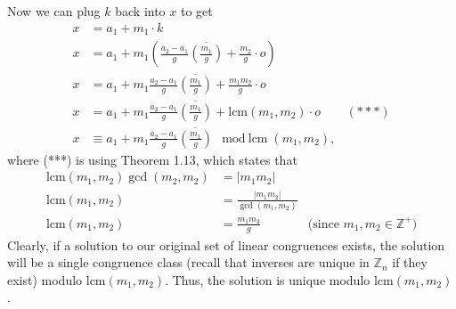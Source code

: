 \documentclass[12 pt]{amsart}
\begin{document}
  Now we can plug $k$ back into $x$ to get
  \begin{align*}
    x &= a_1 + m_1 \cdot k \\
    x &= a_1 + m_1
        \left(
          \frac{a_2 - a_1}{g}  
          \overline{\left( \frac{m_1}{g} \right)}
          + \frac{m_2}{g} \cdot o
        \right) \\
    x &= a_1 
        + m_1 
          \frac{a_2 - a_1}{g}  
          \overline{\left( \frac{m_1}{g} \right)}
        + \frac{m_1 m_2}{g} \cdot o \\
    x &= a_1 
        + m_1 
          \frac{a_2 - a_1}{g}  
          \overline{\left( \frac{m_1}{g} \right)}
          + \text{lcm}(m_1, m_2) \cdot o  & (***) \\
    x &\equiv 
        a_1 
        + m_1 
          \frac{a_2 - a_1}{g}  
          \overline{\left( \frac{m_1}{g} \right)}
        \mod \text{lcm}(m_1, m_2),
  \end{align*}
  where (***) is using Theorem 1.13, which states that 
  \begin{align*}
    \text{lcm}(m_1, m_2) \gcd(m_2, m_2) &= |m_1 m_2|  \\
    \text{lcm}(m_1, m_2)  &= \frac{|m_1 m_2|}{\gcd(m_1, m_2)}  \\
    \text{lcm}(m_1, m_2)  &= \frac{m_1 m_2}{g} & \text{(since $m_1, m_2 \in \mathbb{Z}^+$)}
  \end{align*}
  Clearly, if a solution to our original set of linear congruences
  exists, the solution will be a single congruence class
  (recall that inverses are unique in $\mathbb{Z}_n$ if they exist) 
  modulo $\text{lcm}(m_1, m_2)$. 
  Thus, the solution is unique 
  modulo $\text{lcm}(m_1, m_2)$. 
\vfill
\end{document}
